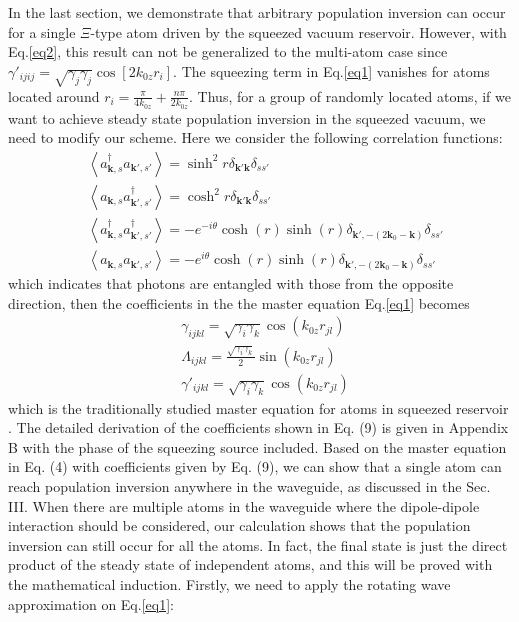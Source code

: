 \documentclass[aps,showpacs,twocolumn,twoside,groupedaddress]{revtex4}
\let\vec\bm
\begin{document}
In the last section, we demonstrate that arbitrary population inversion can occur for a single $\Xi$-type atom driven by the squeezed vacuum reservoir. However, with Eq.\eqref{eq2}, this result can not be generalized to the multi-atom case since $\gamma'_{ijij}=\sqrt{\gamma_{j}\gamma_{j}}\cos[2k_{0z}r_{i}]$. The squeezing term in Eq.\eqref{eq1} vanishes for atoms located around $r_i=\frac{\pi}{4k_{0z}}+\frac{n\pi}{2k_{0z}}$. Thus, for a group of randomly located atoms, if we want to achieve steady state population inversion in the squeezed vacuum, we need to modify our scheme. Here we consider the following correlation functions:
\begin{equation}
\label{eq0b}
\begin{split}
& \left\langle a_{\vec{k},s}^{\dagger}a_{\vec{k}',s'}\right\rangle =\sinh^{2}r\delta_{\vec{k}'\vec{k}}\delta_{ss'} \\
& \left\langle a_{\vec{k},s}a_{\vec{k}',s'}^{\dagger}\right\rangle =\cosh^{2}r\delta_{\vec{k}'\vec{k}}\delta_{ss'}\\
& \left\langle a_{\vec{k},s}^{\dagger}a_{\vec{k}',s'}^{\dagger}\right\rangle =-e^{-i\theta}\cosh(r)\sinh(r)\delta_{\vec{k}',-(2\vec{k}_{0}-\vec{k})}\delta_{ss'}\\
&\left\langle a_{\vec{k},s}a_{\vec{k}',s'}\right\rangle =-e^{i\theta}\cosh(r)\sinh(r)\delta_{\vec{k}',-(2\vec{k}_{0}-\vec{k})}\delta_{ss'}
\end{split}
\end{equation}
which indicates that photons are entangled with those from the opposite direction, then the coefficients in the the master equation Eq.\eqref{eq1} becomes 
\begin{equation}
\label{eq2b}
\begin{split}
& \gamma_{ijkl}=\sqrt{\gamma_{i}\gamma_{k}}\cos(k_{0z}r_{jl}) \\
& \Lambda_{ijkl}=\frac{\sqrt{\gamma_{i}\gamma_{k}}}{2}\sin(k_{0z}r_{jl})\\
& \gamma'_{ijkl}=\sqrt{\gamma_{i}\gamma_{k}}\cos(k_{0z}r_{jl})
\end{split}
\end{equation}
which is the traditionally studied master equation for atoms in squeezed reservoir \cite{tanas2004stationary}. The detailed derivation of the coefficients shown in Eq. (9) is given in Appendix B with the phase of the squeezing source included. Based on the master equation in Eq. (4) with coefficients given by Eq. (9), we can show that a single atom can reach population inversion anywhere in the waveguide, as discussed in the Sec. III. When there are multiple atoms in the waveguide where the dipole-dipole interaction should be considered, our calculation shows that the population inversion can still occur for all the atoms. In fact, the final state is just the direct product of the steady state of independent atoms, and this will be proved with the mathematical induction. Firstly, we need to apply the rotating wave approximation on Eq.\eqref{eq1}: 
\end{document}
